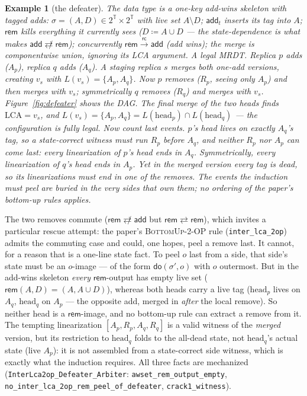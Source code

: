 \documentclass[11pt]{article}
\newtheorem{example}[theorem]{Example}
\newcommand{\rc}{\xrightarrow{\mathsf{rc}}}
\newcommand{\comm}{\rightleftarrows}
\newcommand{\ncomm}{\not\rightleftarrows}
\newcommand{\add}{\mathsf{add}}
\newcommand{\rem}{\mathsf{rem}}
\newcommand{\lean}[1]{\texttt{#1}}
\begin{document}
\begin{example}[the defeater]
\label{ex:defeater}
The data type is a one-key add-wins skeleton with tagged adds:
$\sigma = (A, D) \in 2^{\mathbb{T}} \times 2^{\mathbb{T}}$ with live set
$A \setminus D$; $\add_t$ inserts its tag into $A$; $\rem$ kills
everything it currently sees ($D \coloneqq A \cup D$ --- the
state-dependence is what makes $\add \ncomm \rem$); concurrently
$\rem \rc \add$ (add wins); the merge is componentwise union, ignoring
its LCA argument. A legal MRDT.
Replica $p$ adds ($A_p$), replica $q$ adds ($A_q$). A staging replica $s$
merges both one-add versions, creating $v_s$ with
$L(v_s) = \{A_p, A_q\}$. Now $p$ removes ($R_p$, seeing only $A_p$) and
then merges with $v_s$; symmetrically $q$ removes ($R_q$) and merges with
$v_s$. Figure~\ref{fig:defeater} shows the DAG. The final merge of the two
heads finds $\mathrm{LCA} = v_s$, and
$L(v_s) = \{A_p,A_q\} = L(\text{head}_p) \cap L(\text{head}_q)$ --- the
configuration is fully legal. Now count last events. $p$'s head lives on
exactly $A_q$'s tag, so a state-correct witness must run $R_p$ before
$A_q$, and neither $R_p$ nor $A_p$ can come last: every linearization of
$p$'s head ends in $A_q$. Symmetrically, every linearization of $q$'s
head ends in $A_p$. Yet in the \emph{merged} version every tag is dead,
so its linearizations must end in one of the removes.
The events the induction must peel are \emph{buried} in the very sides
that own them; no ordering of the paper's bottom-up rules applies.
\end{example}

The two removes commute ($\rem \ncomm \add$ but $\rem \comm \rem$), which
invites a particular rescue attempt: the paper's \textsc{BottomUp-2-OP}
rule (\lean{inter\_lca\_2op}) admits the commuting case and could, one
hopes, peel a remove last. It cannot, for a reason that is a one-line
state fact. To peel $o$ last from a side, that side's state must be an
$o$-image --- of the form $\mathsf{do}(\sigma', o)$ with $o$ outermost.
But in the add-wins skeleton \emph{every} $\rem$-output has empty live set
($\rem(A,D) = (A, A\cup D)$), whereas both heads carry a live tag
($\mathrm{head}_p$ lives on $A_q$, $\mathrm{head}_q$ on $A_p$ --- the
opposite add, merged in \emph{after} the local remove). So neither head
is a $\rem$-image, and no bottom-up rule can extract a remove from it. The
tempting linearization $[A_p, R_p, A_q, R_q]$ is a valid witness of the
\emph{merged} version, but its restriction to $\mathrm{head}_q$ folds to
the all-dead state, not $\mathrm{head}_q$'s actual state (live $A_p$): it
is not assembled from a state-correct side witness, which is exactly what
the induction requires. All three facts are mechanized
(\lean{InterLca2op\_Defeater\_Arbiter}: \lean{awset\_rem\_output\_empty},
\lean{no\_inter\_lca\_2op\_rem\_peel\_of\_defeater}, \lean{crack1\_witness}).
\end{document}
